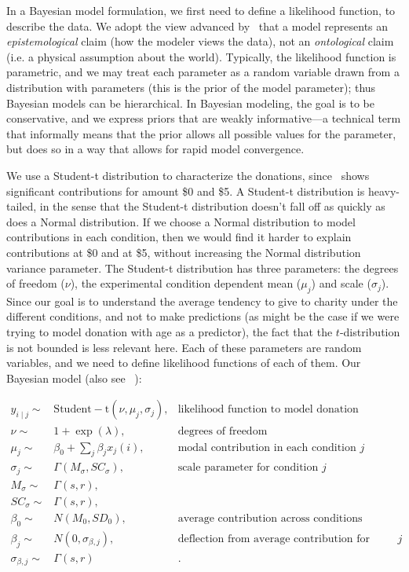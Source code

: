 In a Bayesian model formulation, we first need to define a likelihood function, to describe the data. We adopt the view advanced by~\textcite{McElreath2015} that a model represents an \textit{epistemological} claim (how the modeler views the data), not an \textit{ontological} claim (i.e. a physical assumption about the world). Typically, the likelihood function is parametric, and we may treat each parameter as a random variable drawn from a distribution with parameters (this is the prior of the model parameter); thus Bayesian models can be hierarchical. In Bayesian modeling, the goal is to be conservative, and we express priors that are weakly informative---a technical term that informally means that the prior allows all possible values for the parameter, but does so in a way that allows for rapid model convergence.

We use a Student-t distribution to characterize the donations, since~ shows significant contributions for amount \$0 and \$5. A Student-t distribution is heavy-tailed, in the sense that the Student-t distribution doesn't fall off as quickly as does a Normal distribution. If we choose a Normal distribution to model contributions in each condition, then we would find it harder to explain contributions at \$0 and at \$5, without increasing the Normal distribution variance parameter. The Student-t distribution has three parameters: the degrees of freedom ($\nu$), the experimental condition dependent mean ($\mu_j$) and scale ($\sigma_j$). Since our goal is to understand the average tendency to give to charity under the different conditions, and not to make predictions (as might be the case if we were trying to model donation with age as a predictor), the fact that the $t$-distribution is not bounded is less relevant here.  Each of these parameters are random variables, and we need to define likelihood functions of each of them. Our Bayesian model (also see~ ):


\begin{align}
    y_{i \mid j} \sim &  \mathrm{Student-t}(\nu, \mu_j, \sigma_j),  & \text{likelihood function to model donation}\label{eq:bayesian formulation}\\
    \nu \sim & 1 + \exp(\lambda), & \text{degrees of freedom}\\
    \mu_j \sim & \beta_0 + \sum_j \beta_j x_j(i), & \text{modal contribution in each condition } j\label{eq:mean response}\\
    \sigma_j \sim & \Gamma(M_{\sigma}, SC_{\sigma}), & \text{scale parameter for condition } j\\
    M_{\sigma} \sim & \Gamma(s,r), & \\
    SC_{\sigma} \sim & \Gamma(s,r), &  \\
    \beta_0 \sim & N(M_0, SD_0), & \text{average contribution across conditions}\\
    \beta_j \sim & N (0, \sigma_{\beta, j}), & \text{deflection from average contribution for condition } j\\
    \sigma_{\beta, j} \sim & \Gamma(s,r) & .
\end{align}
 
